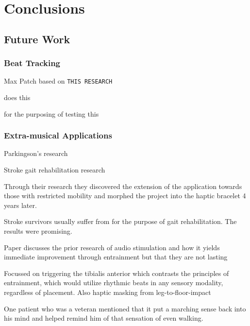 
\chapter{Conclusions} \label{chapConclusions}


\section{Future Work}

\subsection{Beat Tracking}

Max Patch based on \verb!THIS RESEARCH! 

does this

for the purposing of testing this

\subsection{Extra-musical Applications}

Parkingson's research

Stroke gait rehabilitation research \cite{holland2014gait}

Through their research they discovered the extension of the application towards those with restricted mobility and morphed the project into the haptic bracelet 4 years later.

Stroke survivors usually suffer from  for the purpose of gait rehabilitation. The results were promising. 

Paper discusses the prior research of audio stimulation and how it yields immediate improvement through entrainment but that they are not lasting

Focussed on triggering the tibialis anterior which contrasts the principles of entrainment, which would utilize rhythmic beats in any sensory modality, regardless of placement. Also haptic masking from leg-to-floor-impact

One patient who was a veteran mentioned that it put a marching sense back into his mind and helped remind him of that sensation of even walking.
